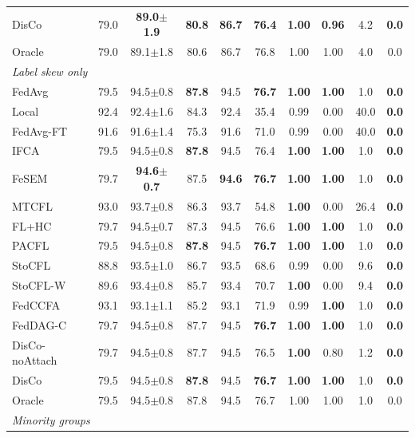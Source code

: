 \begin{tabular}{lccccccccc}
DisCo & 79.0 & \textbf{89.0$\pm$1.9} & \textbf{80.8} & \textbf{86.7} & \textbf{76.4} & \textbf{1.00} & \textbf{0.96} & 4.2 & \textbf{0.0} \\
Oracle & 79.0 & 89.1$\pm$1.8 & 80.6 & 86.7 & 76.8 & 1.00 & 1.00 & 4.0 & 0.0 \\
\midrule
\multicolumn{10}{l}{\textit{Label skew only}}\\
FedAvg & 79.5 & 94.5$\pm$0.8 & \textbf{87.8} & 94.5 & \textbf{76.7} & \textbf{1.00} & \textbf{1.00} & 1.0 & \textbf{0.0} \\
Local & 92.4 & 92.4$\pm$1.6 & 84.3 & 92.4 & 35.4 & 0.99 & 0.00 & 40.0 & \textbf{0.0} \\
FedAvg-FT & 91.6 & 91.6$\pm$1.4 & 75.3 & 91.6 & 71.0 & 0.99 & 0.00 & 40.0 & \textbf{0.0} \\
IFCA & 79.5 & 94.5$\pm$0.8 & \textbf{87.8} & 94.5 & 76.4 & \textbf{1.00} & \textbf{1.00} & 1.0 & \textbf{0.0} \\
FeSEM & 79.7 & \textbf{94.6$\pm$0.7} & 87.5 & \textbf{94.6} & \textbf{76.7} & \textbf{1.00} & \textbf{1.00} & 1.0 & \textbf{0.0} \\
MTCFL & 93.0 & 93.7$\pm$0.8 & 86.3 & 93.7 & 54.8 & \textbf{1.00} & 0.00 & 26.4 & \textbf{0.0} \\
FL+HC & 79.7 & 94.5$\pm$0.7 & 87.3 & 94.5 & 76.6 & \textbf{1.00} & \textbf{1.00} & 1.0 & \textbf{0.0} \\
PACFL & 79.5 & 94.5$\pm$0.8 & \textbf{87.8} & 94.5 & \textbf{76.7} & \textbf{1.00} & \textbf{1.00} & 1.0 & \textbf{0.0} \\
StoCFL & 88.8 & 93.5$\pm$1.0 & 86.7 & 93.5 & 68.6 & 0.99 & 0.00 & 9.6 & \textbf{0.0} \\
StoCFL-W & 89.6 & 93.4$\pm$0.8 & 85.7 & 93.4 & 70.7 & \textbf{1.00} & 0.00 & 9.4 & \textbf{0.0} \\
FedCCFA & 93.1 & 93.1$\pm$1.1 & 85.2 & 93.1 & 71.9 & 0.99 & \textbf{1.00} & 1.0 & \textbf{0.0} \\
FedDAG-C & 79.7 & 94.5$\pm$0.8 & 87.7 & 94.5 & \textbf{76.7} & \textbf{1.00} & \textbf{1.00} & 1.0 & \textbf{0.0} \\
DisCo-noAttach & 79.7 & 94.5$\pm$0.8 & 87.7 & 94.5 & 76.5 & \textbf{1.00} & 0.80 & 1.2 & \textbf{0.0} \\
DisCo & 79.5 & 94.5$\pm$0.8 & \textbf{87.8} & 94.5 & \textbf{76.7} & \textbf{1.00} & \textbf{1.00} & 1.0 & \textbf{0.0} \\
Oracle & 79.5 & 94.5$\pm$0.8 & 87.8 & 94.5 & 76.7 & 1.00 & 1.00 & 1.0 & 0.0 \\
\midrule
\multicolumn{10}{l}{\textit{Minority groups}}\\

\end{tabular}
